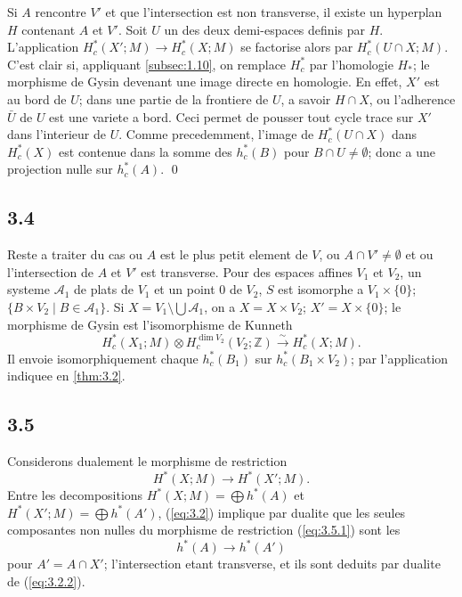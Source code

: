 \documentclass[11pt,a4paper]{article}
\theoremstyle{plain}
\theoremstyle{definition}
\begin{document}
Si $A$ rencontre $V'$ et que l'intersection est non transverse, il existe un hyperplan $H$ contenant $A$ et $V'$. Soit $U$ un des deux demi-espaces definis par $H$. L'application $H^*_c(X';M) \to H^*_c(X;M)$ se factorise alors par $H^*_c(U \cap X;M)$. C'est clair si, appliquant \ref{subsec:1.10}, on remplace $H^*_c$ par l'homologie $H_*$; le morphisme de Gysin devenant une image directe en homologie. En effet, $X'$ est au bord de $U$; dans une partie de la frontiere de $U$, a savoir $H \cap X$, ou l'adherence $\bar{U}$ de $U$ est une variete a bord. Ceci permet de pousser tout cycle trace sur $X'$ dans l'interieur de $U$. Comme precedemment, l'image de $H^*_c(U \cap X)$ dans $H^*_c(X)$ est contenue dans la somme des $h^*_c(B)$ pour $B \cap U \neq \emptyset$; donc a une projection nulle sur $h^*_c(A)$.
\qed

\subsection{3.4}\label{subsec:3.4}

Reste a traiter du cas ou $A$ est le plus petit element de $V$, ou $A \cap V' \neq \emptyset$ et ou l'intersection de $A$ et $V'$ est transverse. Pour des espaces affines $V_1$ et $V_2$, un systeme $\mathcal{A}_1$ de plats de $V_1$ et un point $0$ de $V_2$, $S$ est isomorphe a $V_1 \times \{0\}$; $\{B \times V_2 \mid B \in \mathcal{A}_1\}$. Si $X = V_1 \setminus \bigcup\mathcal{A}_1$, on a $X = X \times V_2$; $X' = X \times \{0\}$; le morphisme de Gysin est l'isomorphisme de Kunneth
\[H^*_c(X_1;M) \otimes H^{\dim V_2}_c(V_2;\mathbb{Z}) \xrightarrow{\sim} H^*_c(X;M).\]
Il envoie isomorphiquement chaque $h^*_c(B_1)$ sur $h^*_c(B_1 \times V_2)$; par l'application indiquee en \ref{thm:3.2}.

\subsection{3.5}\label{subsec:3.5}

Considerons dualement le morphisme de restriction
\begin{equation}\label{eq:3.5.1}
H^*(X;M) \longrightarrow H^*(X';M).
\tag{3.5.1}
\end{equation}
Entre les decompositions $H^*(X;M) = \bigoplus h^*(A)$ et $H^*(X';M) = \bigoplus h^*(A')$, (\ref{eq:3.2}) implique par dualite que les seules composantes non nulles du morphisme de restriction (\ref{eq:3.5.1}) sont les
\[h^*(A) \longrightarrow h^*(A')\]
pour $A' = A \cap X'$; l'intersection etant transverse, et ils sont deduits par dualite de (\ref{eq:3.2.2}).
\end{document}
